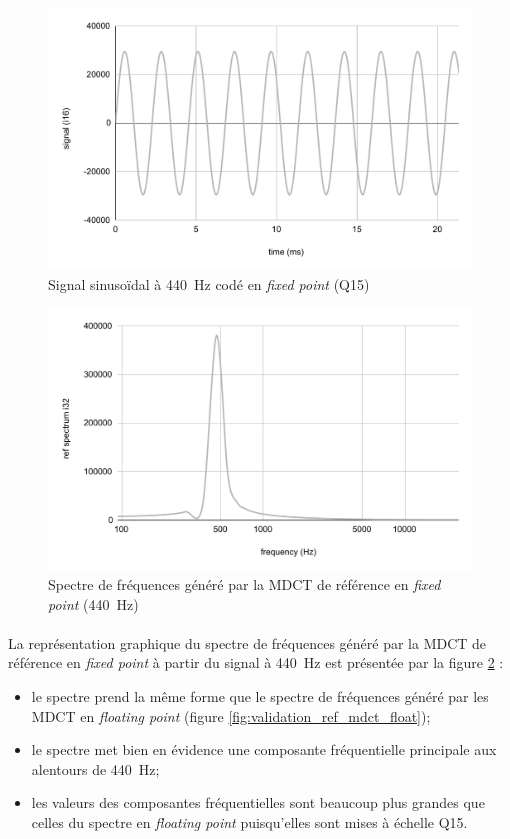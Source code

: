 \documentclass{article}
\begin{document}
    \begin{figure}[H]
        \centering
        \includegraphics[width=.8\linewidth]{./images/signal_i16.pdf}
        \caption{Signal sinusoïdal à \SI{440}{\hertz} codé en \emph{fixed point} (Q15)}
        \label{fig:signal_i16}
    \end{figure}

    \begin{figure}[H]
        \centering
        \includegraphics[width=.8\linewidth]{./images/validation_ref_int.pdf}
        \caption{Spectre de fréquences généré par la MDCT de référence en \emph{fixed point} (\SI{440}{\hertz})}
        \label{fig:validation_ref_mdct_int}
    \end{figure}

    \paragraph{}
    La représentation graphique du spectre de fréquences généré par la MDCT de référence en \emph{fixed point} à partir du signal à \SI{440}{\hertz} est présentée par la figure \ref{fig:validation_ref_mdct_int} :
    \begin{itemize}
        \item le spectre prend la même forme que le spectre de fréquences généré par les MDCT en \emph{floating point} (figure \ref{fig:validation_ref_mdct_float});
        \item le spectre met bien en évidence une composante fréquentielle principale aux alentours de \SI{440}{\hertz};
        \item les valeurs des composantes fréquentielles sont beaucoup plus grandes que celles du spectre en \emph{floating point} puisqu'elles sont mises à échelle Q15.
    \end{itemize}
\end{document}
